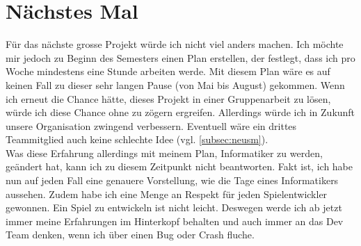 \section{Nächstes Mal}
Für das nächste grosse Projekt würde ich nicht viel anders machen. Ich möchte mir jedoch zu Beginn des Semesters einen Plan erstellen, der festlegt, dass ich pro Woche mindestens eine Stunde arbeiten werde. Mit diesem Plan wäre es auf keinen Fall zu dieser sehr langen
Pause (von Mai bis August) gekommen. Wenn ich erneut die Chance hätte, dieses Projekt in einer Gruppenarbeit zu lösen, würde ich diese Chance ohne zu zögern ergreifen. Allerdings würde ich in Zukunft
unsere Organisation zwingend verbessern. Eventuell wäre ein drittes Teammitglied auch keine schlechte Idee (vgl. \autoref{subsec:neusm}).\\
Was diese Erfahrung allerdings mit meinem Plan, Informatiker zu werden, geändert hat, kann ich zu diesem Zeitpunkt nicht beantworten. Fakt ist, ich habe nun auf jeden Fall eine genauere Vorstellung,
wie die Tage eines Informatikers aussehen. Zudem habe ich eine Menge an Respekt für jeden Spielentwickler gewonnen. Ein Spiel zu entwickeln ist nicht leicht. Deswegen werde ich ab jetzt immer meine Erfahrungen im Hinterkopf
behalten und auch immer an das Dev Team denken, wenn ich über einen Bug oder Crash fluche.